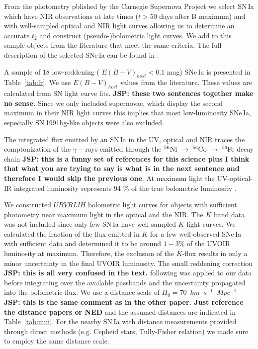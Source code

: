 \documentclass[traditabstract]{aa}
\newcommand{\Nif}{$
\rm ^{56}Ni$ }
\begin{document}
From the photometry pblished by the Carnegie Supernova Project \citep[CSP;][]{ Contreras2010,Burns2011,Stritzinger2011,Phillips2012,Burns2014} we select SN\,Ia which have NIR observations at late times ($t>50$ days after B maximum) and with well-sampled optical and NIR light curves allowing us to determine an accurate $t_2$ and construct (pseudo-)bolometric light curves. We add to this sample objects from the literature that meet the same criteria. The full description of the selected SNe\,Ia can be found in \citet{Dhawan2015}.

A sample of 18 low-reddening ( $E(B-V)_{host}<0.1$ mag) SNe\,Ia is presented in Table~\ref{tab:lr}. We use $E(B-V)_{host}$ values from the literature. These values are calculated from SN light curve fits. {\bf JSP: these two sentences together make no sense.} Since we only included supernovae, which display the second maximum in their NIR light curves this implies that most low-luminosity SNe\,Ia, especially SN\,1991bg-like objects were also excluded.

The integrated flux emitted by an SN\,Ia in the UV, optical and NIR traces the comptonization of the $\gamma-$rays emitted through the \Nif $\rightarrow$  $^{56}$Co $\rightarrow$ $^{56}$Fe decay chain \citep[e.g.][]{Nadyozhin1994} {\bf JSP: this is a funny set of references for this science plus I think that what you are trying to say is what is in the next sentence and therefore I would skip the previous one}.
At maximum light the UV-optical-IR integrated luminosity represents 94 $\%$ of the true bolometric luminosity \citep{Blondin2015}. 

We constructed $UBVRIJH$ bolometric light curves for objects with sufficient photometry near maximum light in the optical and the NIR. The $K$ band data was not included since only few SN\,Ia have well-sampled $K$ light curves. We calculated the fraction of the flux emitted in $K$ for a few well-observed SNe\,Ia with sufficient data and determined it to be around $1-3 \%$ of the UVOIR luminosity at maximum. Therefore, the exclusion of the $K$-flux results in only a minor uncertainty in the final UVOIR luminosity.  
The small reddening correction {\bf JSP: this is all very confused in the text. } following \citet{Cardelli1989} was applied to our data before integrating over the available passbands and the uncertainty propagated into the bolometric flux. We use a distance scale of $H_0=70$~$km$~$s^{-1}$~$Mpc^{-1}$ {\bf JSP: this is the same comment as in the other paper. Just reference the distance papers or NED} and the assumed distances are indicated in Table~\ref{tab:mni}. For the nearby SN\,Ia with distance measurements provided through direct methods (e.g. Cepheid stars, Tully-Fisher relation) we made sure to employ the same distance scale. 
\end{document}
